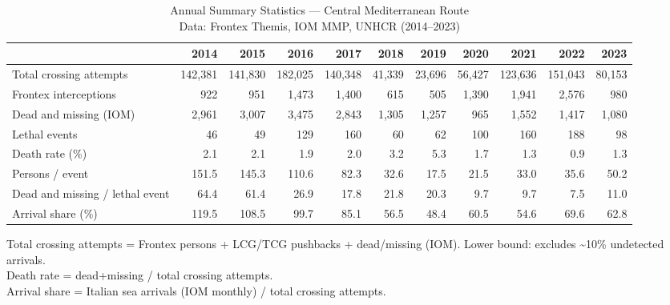 \begin{table}[t]
\caption*{
{\fontsize{20}{25}\selectfont  Annual Summary Statistics — Central Mediterranean Route\fontsize{12}{15}\selectfont } \\ 
{\fontsize{14}{17}\selectfont  Data: Frontex Themis, IOM MMP, UNHCR (2014–2023)\fontsize{12}{15}\selectfont }
} 
\fontsize{12.0pt}{14.0pt}\selectfont
\begin{tabular*}{\linewidth}{@{\extracolsep{\fill}}l|rrrrrrrrrr}
\toprule
 & 2014 & 2015 & 2016 & 2017 & 2018 & 2019 & 2020 & 2021 & 2022 & 2023 \\ 
\midrule\addlinespace[2.5pt]
Total crossing attempts & 142,381 & 141,830 & 182,025 & 140,348 & 41,339 & 23,696 & 56,427 & 123,636 & 151,043 & 80,153 \\ 
Frontex interceptions & 922 & 951 & 1,473 & 1,400 & 615 & 505 & 1,390 & 1,941 & 2,576 & 980 \\ 
Dead and missing (IOM) & 2,961 & 3,007 & 3,475 & 2,843 & 1,305 & 1,257 & 965 & 1,552 & 1,417 & 1,080 \\ 
Lethal events & 46 & 49 & 129 & 160 & 60 & 62 & 100 & 160 & 188 & 98 \\ 
Death rate (\%) & 2.1 & 2.1 & 1.9 & 2.0 & 3.2 & 5.3 & 1.7 & 1.3 & 0.9 & 1.3 \\ 
Persons / event & 151.5 & 145.3 & 110.6 & 82.3 & 32.6 & 17.5 & 21.5 & 33.0 & 35.6 & 50.2 \\ 
Dead and missing / lethal event & 64.4 & 61.4 & 26.9 & 17.8 & 21.8 & 20.3 & 9.7 & 9.7 & 7.5 & 11.0 \\ 
Arrival share (\%) & 119.5 & 108.5 & 99.7 & 85.1 & 56.5 & 48.4 & 60.5 & 54.6 & 69.6 & 62.8 \\ 
\bottomrule
\end{tabular*}
\begin{minipage}{\linewidth}
\vspace{.05em}
Total crossing attempts = Frontex persons + LCG/TCG pushbacks + dead/missing (IOM). Lower bound: excludes \textasciitilde{}10\% undetected arrivals.\\
Death rate = dead+missing / total crossing attempts.\\
Arrival share = Italian sea arrivals (IOM monthly) / total crossing attempts.\\
\end{minipage}
\end{table}

